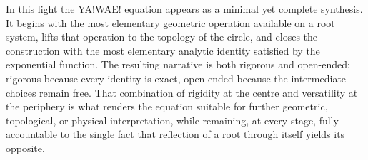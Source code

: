 In this light the YA!WAE! equation appears as a minimal yet complete synthesis. It begins with the most elementary geometric operation available on a root system, lifts that operation to the topology of the circle, and closes the construction with the most elementary analytic identity satisfied by the exponential function. The resulting narrative is both rigorous and open-ended: rigorous because every identity is exact, open-ended because the intermediate choices remain free. That combination of rigidity at the centre and versatility at the periphery is what renders the equation suitable for further geometric, topological, or physical interpretation, while remaining, at every stage, fully accountable to the single fact that reflection of a root through itself yields its opposite.
